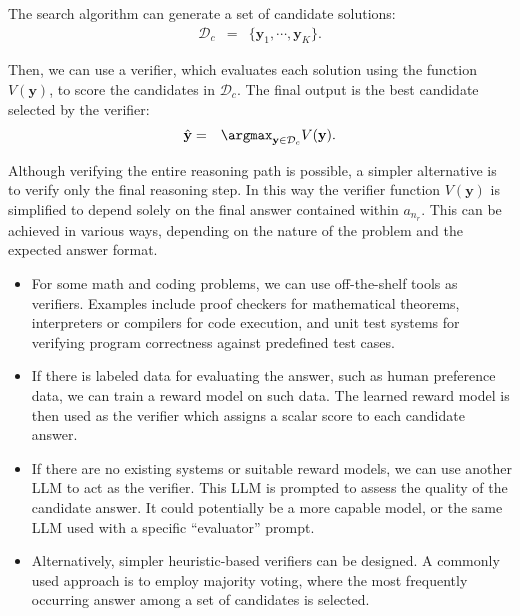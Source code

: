 The search algorithm can generate a set of candidate solutions:
\begin{eqnarray}
\mathcal{D}_c & = & \{\mathbf{y}_1,\cdots,\mathbf{y}_K\}.
\end{eqnarray}

Then, we can use a verifier, which evaluates each solution using the function $V(\mathbf{y})$, to score the candidates in $\mathcal{D}_c$. The final output is the best candidate selected by the verifier:
\begin{eqnarray}
\hat{\mathbf{y}} & = & \argmax_{\mathbf{y} \in \mathcal{D}_c} V(\mathbf{y}).
\end{eqnarray}

Although verifying the entire reasoning path is possible, a simpler alternative is to verify only the final reasoning step. In this way the verifier function $V(\mathbf{y})$ is simplified to depend solely on the final answer contained within $a_{n_r}$. This can be achieved in various ways, depending on the nature of the problem and the expected answer format.

\begin{itemize}
\item \vspace{0.5em} For some math and coding problems, we can use off-the-shelf tools as verifiers. Examples include proof checkers for mathematical theorems, interpreters or compilers for code execution, and unit test systems for verifying program correctness against predefined test cases.
\item \vspace{0.3em} If there is labeled data for evaluating the answer, such as human preference data, we can train a reward model on such data. The learned reward model is then used as the verifier which assigns a scalar score to each candidate answer.
\item \vspace{0.3em} If there are no existing systems or suitable reward models, we can use another LLM to act as the verifier. This LLM is prompted to assess the quality of the candidate answer. It could potentially be a more capable model, or the same LLM used with a specific ``evaluator'' prompt.
\item \vspace{0.3em} Alternatively, simpler heuristic-based verifiers can be designed. A commonly used approach is to employ majority voting, where the most frequently occurring answer among a set of candidates is selected.
\end{itemize}
\vspace{0.3em}


